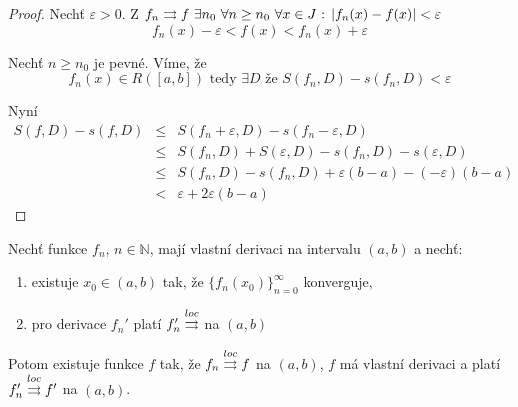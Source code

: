 \begin{proof}
Nechť $\varepsilon > 0$. Z $f_n \rightrightarrows f \ \exists n_0 \ \forall n \geq n_0 \ \forall x \in J \textrm{ : } |f_n(x) - f(x)| < \varepsilon$
$$f_n(x) - \varepsilon < f(x) < f_n(x) + \varepsilon$$

Nechť $n \geq n_0$ je pevné. Víme, že 
$$f_n(x) \in R([a,b]) \textrm{ tedy } \exists D \textrm{ že } S(f_n,D) - s(f_n,D) < \varepsilon$$

Nyní
\begin{eqnarray*}
S(f,D) - s(f,D) & \leq & S(f_n+\varepsilon, D) - s(f_n-\varepsilon,D) \\
& \leq & S(f_n,D)+S(\varepsilon,D) - s(f_n,D) - s(\varepsilon,D) \\
& \leq & S(f_n,D) - s(f_n,D) +\varepsilon(b-a) - (-\varepsilon)(b-a) \\
& < & \varepsilon +2\varepsilon(b-a)
\end{eqnarray*}
\end{proof}

\begin{vetat}
Nechť funkce $f_n$, $n \in \mathbb{N}$, mají vlastní derivaci na intervalu $(a,b)$ a nechť:
\begin{enumerate}
\item existuje $x_0 \in (a,b)$ tak, že $\{f_n(x_0)\}_{n=0}^{\infty}$ konverguje,
\item pro derivace $f_n'$ platí $f_n' \overset{loc}{\rightrightarrows}$ na $(a,b)$
\end{enumerate}
Potom existuje funkce $f$ tak, že $f_n \overset{loc}{\rightrightarrows} f$ na $(a,b)$, $f$ má vlastní derivaci a platí $f_n' \overset{loc}{\rightrightarrows} f'$ na $(a,b)$.
\end{vetat}

